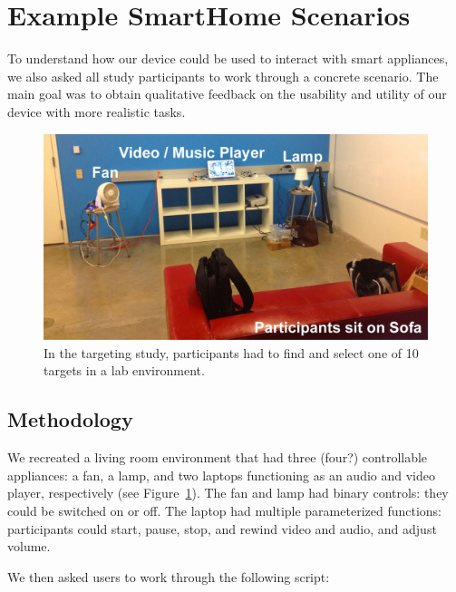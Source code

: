 \section{Example SmartHome Scenarios}
To understand how our device could be used to interact with smart appliances, we also asked all study participants to work through a concrete scenario. The main goal was to obtain qualitative feedback on the usability and utility of our device with more realistic tasks.

\begin{figure}[t]
\centering
\includegraphics[width=1.0\columnwidth]{figures/smarthome-scenario.jpg}
\caption{In the targeting study, participants had to find and select one of 10 targets in a lab environment.}
\label{fig:smarthome}
\end{figure}

\subsection{Methodology}
We recreated a living room environment that had three (four?) controllable appliances: a fan, a lamp, and two laptops functioning as an audio and video player, respectively (see Figure~\ref{fig:smarthome}). The fan and lamp had binary controls: they could be switched on or off. The laptop had multiple parameterized functions: participants could start, pause, stop, and rewind  video and audio, and adjust volume.

We then asked users to work through the following script:


